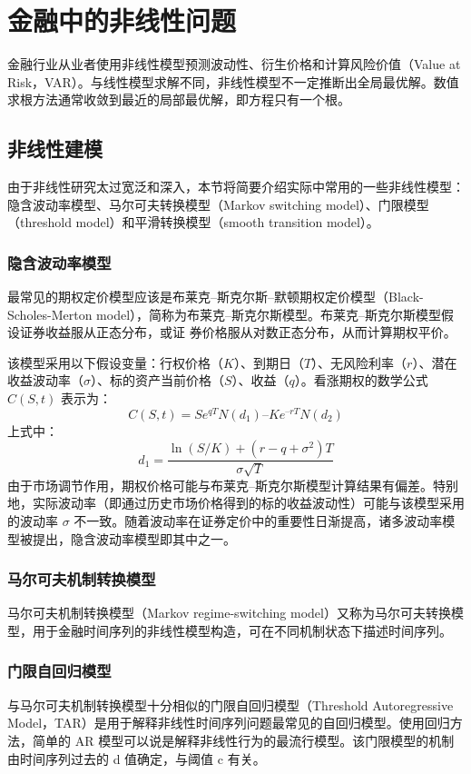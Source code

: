 \chapter{金融中的非线性问题\label{ch03}}
金融行业从业者使用非线性模型预测波动性、衍生价格和计算风险价值（Value at Risk，VAR）。与线性模型求解不同，非线性模型不一定推断出全局最优解。数值求根方法通常收敛到最近的局部最优解，即方程只有一个根。
\section{非线性建模}
由于非线性研究太过宽泛和深入，本节将简要介绍实际中常用的一些非线性模型：隐含波动率模型、马尔可夫转换模型（Markov switching model）、门限模型（threshold model）和平滑转换模型（smooth transition model）。

\subsection{隐含波动率模型}
最常见的期权定价模型应该是布莱克–斯克尔斯–默顿期权定价模型（Black-Scholes-Merton model），简称为布莱克–斯克尔斯模型。布莱克–斯克尔斯模型假设证券收益服从正态分布，或证
券价格服从对数正态分布，从而计算期权平价。

该模型采用以下假设变量：行权价格（$K$）、到期日（$T$）、无风险利率（$r$）、潜在收益波动率（$\sigma$）、标的资产当前价格（$S$）、收益（$q$）。看涨期权的数学公式 $C(S, t)$ 表示为：
\begin{equation}
    C(S, t) = Se^{qT}N(d_1) – Ke^{–rT}N(d_2)
\end{equation}
上式中：
\begin{equation*}
    d_1=\frac{\ln(S/K)+(r-q+\sigma^2)T}{\sigma\sqrt{T}}
\end{equation*}
由于市场调节作用，期权价格可能与布莱克–斯克尔斯模型计算结果有偏差。特别地，实际波动率（即通过历史市场价格得到的标的收益波动性）可能与该模型采用的波动率 $\sigma$ 不一致。随着波动率在证券定价中的重要性日渐提高，诸多波动率模型被提出，隐含波动率模型即其中之一。
\subsection{马尔可夫机制转换模型}
马尔可夫机制转换模型（Markov regime-switching model）又称为马尔可夫转换模型，用于金融时间序列的非线性模型构造，可在不同机制状态下描述时间序列。
\subsection{门限自回归模型}
与马尔可夫机制转换模型十分相似的门限自回归模型（Threshold Autoregressive Model，TAR）是用于解释非线性时间序列问题最常见的自回归模型。使用回归方法，简单的 AR 模型可以说是解释非线性行为的最流行模型。该门限模型的机制由时间序列过去的 d 值确定，与阈值 c 有关。

